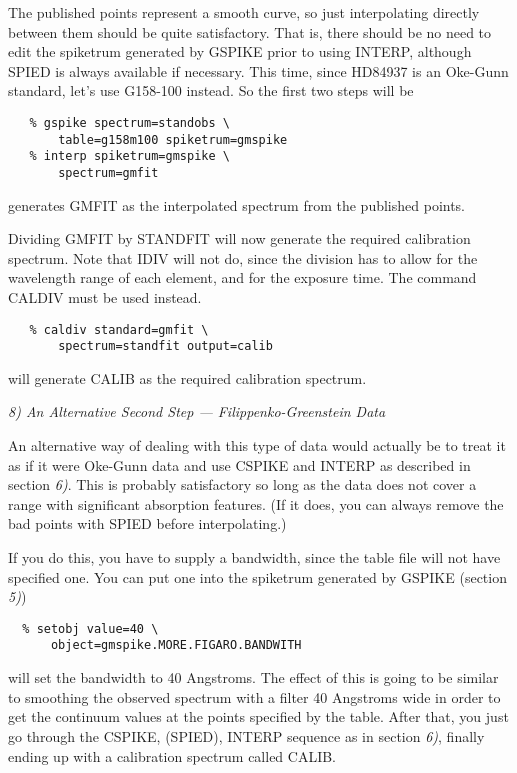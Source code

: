 The published points represent a smooth curve, so just
interpolating directly between them should be quite satisfactory.  That
is, there should be no need to edit the spike\-trum generated by GSPIKE
prior to using INTERP, although SPIED is always available if necessary.
This time, since HD84937 is an Oke-Gunn standard, let's use G158-100
instead.  So the first two steps will be

\begin{verbatim}
   % gspike spectrum=standobs \
       table=g158m100 spiketrum=gmspike
   % interp spiketrum=gmspike \
       spectrum=gmfit
\end{verbatim}

generates GMFIT as the interpolated spectrum from the published points.

Dividing GMFIT by STANDFIT will now generate the required calibration
spectrum.  Note that IDIV will not do, since the division has to allow for
the wavelength range of each element, and for the exposure time.  The
command CALDIV must be used instead.

\begin{verbatim}
   % caldiv standard=gmfit \
       spectrum=standfit output=calib
\end{verbatim}

will generate CALIB as the required calibration spectrum.


\goodbreak
\vspace{12pt}
{\it 8) An Alternative Second Step --- Filippenko-Green\-stein Data}

An alternative way of dealing with this type of data would actually
be to treat it as if it were Oke-Gunn data and use CSPIKE and INTERP as
described in section {\it 6)}.  This is probably satisfactory so long as the
data does not cover a range with significant absorption features.  (If it
does, you can always remove the bad points with SPIED before interpolating.)

If you do this, you have to supply a bandwidth, since the table file
will not have specified one.  You can put one into the spike\-trum generated
by GSPIKE (section {\it 5)})

\begin{verbatim}
  % setobj value=40 \
      object=gmspike.MORE.FIGARO.BANDWITH
\end{verbatim}

will set the bandwidth to 40 Angstroms.  The effect of this is going to
be similar to smoothing the observed spectrum with a filter 40 Angstroms
wide in order to get the continuum values at the points specified by the
table.  After that, you just go through the CSPIKE, (SPIED), INTERP
sequence as in section {\it 6)}, finally ending up with a calibration
spectrum called CALIB.


